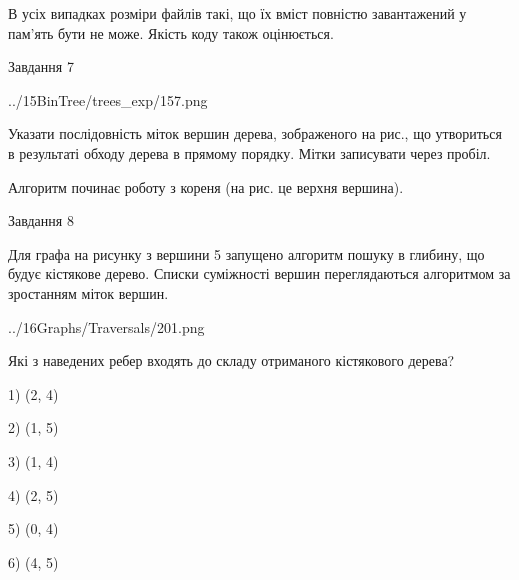 \documentclass[12pt, ukrainian]{article}
\begin{document}
{В усіх випадках розміри файлів такі, що їх вміст повністю завантажений у пам'ять бути не може. Якість коду також оцінюється.



\vspace{10mm}\par

\newpage
\begin{minipage}[t]{9.7cm}
               
{\begin{center}Завдання {7}\end{center}}
\vspace{-4mm}

\begin{center}
	{../15BinTree/trees_exp/157.png}
\end{center}
Указати послідовність міток вершин дерева, зображеного на рис., що утвориться в результаті обходу дерева в прямому порядку. Мітки записувати через пробіл.\par Алгоритм починає роботу з кореня (на рис. це верхня вершина).\par

\end{minipage}
\vline \hspace{8mm}
\begin{minipage}[t]{8.0cm}
               
{\begin{center}Завдання {8}\end{center}}
\vspace{-4mm}
Для графа на рисунку з вершини 5 запущено алгоритм пошуку в глибину, що будує кістякове дерево. Списки суміжності вершин переглядаються алгоритмом за зростанням міток вершин.\par
\begin{center}
	{../16Graphs/Traversals/201.png}
\end{center}
\par Які з наведених ребер входять до складу отриманого кістякового дерева?\par
1) (2, 4)\par
2) (1, 5)\par
3) (1, 4)\par
4) (2, 5)\par
5) (0, 4)\par
6) (4, 5)\par
{\vskip 15pt} \par


\end{minipage}}
\end{document}
